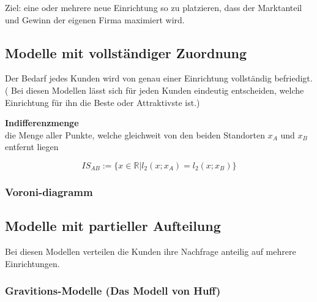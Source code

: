     \par Ziel: eine oder mehrere neue Einrichtung so zu platzieren, dass der Marktanteil und Gewinn der eigenen Firma maximiert wird.

    \subsection{Modelle mit vollständiger Zuordnung} %
    \label{sub:modelle_mit_vollst_ndiger_zuordnung}

      \par Der Bedarf jedes Kunden wird von genau einer Einrichtung vollständig befriedigt. (
      Bei diesen Modellen lässt sich für jeden Kunden eindeutig entscheiden, welche Einrichtung für ihn die Beste oder Attraktivste ist.)

      \begin{defn}
        \textbf{Indifferenzmenge} \\
        die Menge aller Punkte, welche gleichweit von den beiden Standorten $x_A$ und $x_B$ entfernt liegen

        \begin{equation}
          IS_{AB} := \{x \in \mathbb{R} | l_2(x;x_A) = l_2(x; x_B)\}
        \end{equation}
      \end{defn}
      \subsubsection{Voroni-diagramm} %
         \label{ssub:voroni_diagramm}

          \begin{exmp}
            \color{blue}{Aufgabe 5}
          \end{exmp}
         

    \subsection{Modelle mit partieller Aufteilung} %
    \label{sub:modelle_mit_partieller_aufteilung}

      \par Bei diesen Modellen verteilen die Kunden ihre Nachfrage anteilig auf mehrere Einrichtungen.

      \subsubsection{Gravitions-Modelle (Das Modell von Huff)} %
      \label{ssub:gravitions_modelle_}

